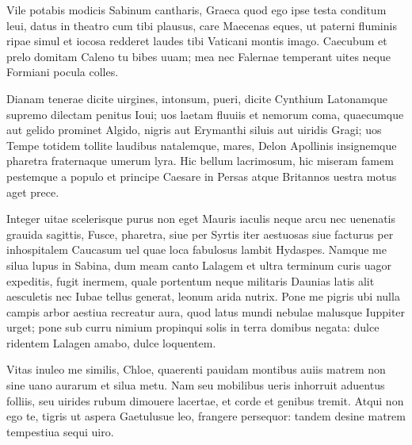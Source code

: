 \documentclass{book}
\newenvironment {carmen} [1] [\relax] 
  {\Titulus \Versus \incipit*\numerus{1}#1}
  {\endVersus}
\newcommand {\Sapphic}   {\Forma \strophae {0 \poena 00 \poena 1}}
\newcommand {\AsclB}     {\Forma \strophae {0 \poena 02 \poena 3}}
\begin{document}
\begin{carmen}[\Sapphic]


 Vile potabis modicis Sabinum
 cantharis, Graeca quod ego ipse testa
 conditum leui, datus in theatro
      cum tibi plausus,
 care Maecenas eques, ut paterni               
 fluminis ripae simul et iocosa
 redderet laudes tibi Vaticani
      montis imago.
 Caecubum et prelo domitam Caleno
 tu bibes uuam; mea nec Falernae               
 temperant uites neque Formiani
      pocula colles. 

\end{carmen}

\begin{carmen}[\AsclB]


 Dianam tenerae dicite uirgines,
 intonsum, pueri, dicite Cynthium
      Latonamque supremo
      dilectam penitus Ioui;
 uos laetam fluuiis et nemorum coma,               
 quaecumque aut gelido prominet Algido,
      nigris aut Erymanthi
      siluis aut uiridis Gragi;
 uos Tempe totidem tollite laudibus
 natalemque, mares, Delon Apollinis               
      insignemque pharetra
      fraternaque umerum lyra.
 Hic bellum lacrimosum, hic miseram famem
 pestemque a populo et principe Caesare in
       Persas atque Britannos
      uestra motus aget prece.                

\end{carmen}

\begin{carmen}[\Sapphic]


 Integer uitae scelerisque purus
 non eget Mauris iaculis neque arcu
 nec uenenatis grauida sagittis,
      Fusce, pharetra,
 siue per Syrtis iter aestuosas               
 siue facturus per inhospitalem
 Caucasum uel quae loca fabulosus
      lambit Hydaspes.
 Namque me silua lupus in Sabina,
 dum meam canto Lalagem et ultra               
 terminum curis uagor expeditis,
      fugit inermem,
 quale portentum neque militaris
 Daunias latis alit aesculetis
 nec Iubae tellus generat, leonum               
      arida nutrix.
 Pone me pigris ubi nulla campis
 arbor aestiua recreatur aura,
 quod latus mundi nebulae malusque
       Iuppiter urget;               
 pone sub curru nimium propinqui
 solis in terra domibus negata:
 dulce ridentem Lalagen amabo,
      dulce loquentem. 

\end{carmen}

\begin{carmen}[\AsclB]


 Vitas inuleo me similis, Chloe,
 quaerenti pauidam montibus auiis
      matrem non sine uano
      aurarum et silua metu.
 Nam seu mobilibus ueris inhorruit               
 aduentus folliis, seu uirides rubum
      dimouere lacertae,
      et corde et genibus tremit.
 Atqui non ego te, tigris ut aspera
 Gaetulusue leo, frangere persequor:               
      tandem desine matrem
      tempestiua sequi uiro. 

\end{carmen}
\end{document}
